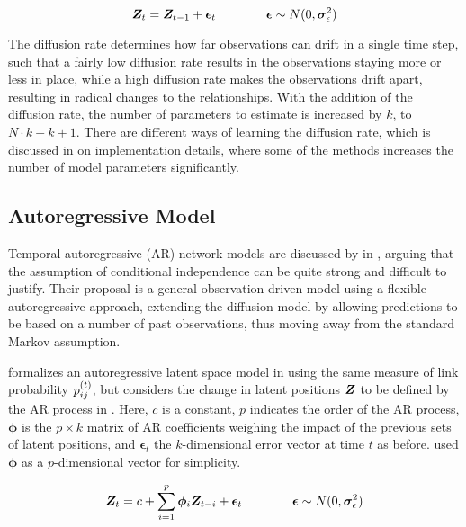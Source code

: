     \begin{equation}\label{eq:dsnl-latent-space}
        \bm{Z}_t = \bm{Z}_{t-1} + \bm{\epsilon}_t \qquad\qquad \bm{\epsilon} \sim N(0,\bm{\sigma}_\epsilon^2)
    \end{equation}
    
    The diffusion rate determines how far observations can drift in a single time step, such that a fairly low diffusion rate results in the observations staying more or less in place, while a high diffusion rate makes the observations drift apart, resulting in radical changes to the relationships. With the addition of the diffusion rate, the number of parameters to estimate is increased by $k$, to $N\cdot k + k + 1$. There are different ways of learning the diffusion rate, which is discussed in  on implementation details, where some of the methods increases the number of model parameters significantly.
    
    

\subsection{Autoregressive Model}

    Temporal autoregressive (AR) network models are discussed by \citeauthor{sewell2018simultaneous} in \cite{sewell2018simultaneous}, arguing that the assumption of conditional independence can be quite strong and difficult to justify. Their proposal is a general observation-driven model using a flexible autoregressive approach, extending the diffusion model by allowing predictions to be based on a number of past observations, thus moving away from the standard Markov assumption. 
    
    \citeauthor{zangenberg2018a} formalizes an autoregressive latent space model in \cite{zangenberg2018a} using the same measure of link probability $\sub(p)^\t$, but considers the change in latent positions $\bm{Z}$ to be defined by the AR process in . Here, $c$ is a constant, $p$ indicates the order of the AR process, $\bm{\phi}$ is the $p\times k$ matrix of AR coefficients weighing the impact of the previous sets of latent positions, and $\bm{\epsilon}_t$ the $k$-dimensional error vector at time $t$ as before. \citeauthor{zangenberg2018a} used $\bm{\phi}$ as a $p$-dimensional vector for simplicity.
    
    \begin{equation}\label{eq:ar-model}
        \bm{Z}_t = c+\sum_{i=1}^p \bm{\phi}_i \bm{Z}_{t-i} + \bm{\epsilon}_t \qquad\qquad \bm{\epsilon} \sim N(0,\bm{\sigma}_\epsilon^2)
    \end{equation}
    
